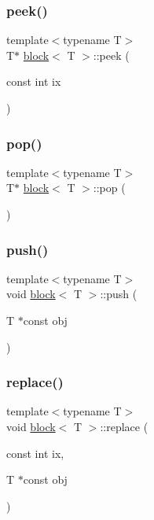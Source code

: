 \subsubsection{\texorpdfstring{peek()}{peek()}}
{\footnotesize\ttfamily template$<$typename T$>$ \\
T$\ast$ \hyperlink{classblock}{block}$<$ T $>$\+::peek (\begin{DoxyParamCaption}\item[{const int}]{ix }\end{DoxyParamCaption})\hspace{0.3cm}{\ttfamily [inline]}}

\mbox{\label{classblock_aa247fbd643eede27ec2ca95882d72301}} 
\subsubsection{\texorpdfstring{pop()}{pop()}}
{\footnotesize\ttfamily template$<$typename T$>$ \\
T$\ast$ \hyperlink{classblock}{block}$<$ T $>$\+::pop (\begin{DoxyParamCaption}{ }\end{DoxyParamCaption})\hspace{0.3cm}{\ttfamily [inline]}}

\mbox{\label{classblock_ab91760496bae106253e3ddd42757287a}} 
\subsubsection{\texorpdfstring{push()}{push()}}
{\footnotesize\ttfamily template$<$typename T$>$ \\
void \hyperlink{classblock}{block}$<$ T $>$\+::push (\begin{DoxyParamCaption}\item[{T $\ast$const}]{obj }\end{DoxyParamCaption})\hspace{0.3cm}{\ttfamily [inline]}}

\mbox{\label{classblock_a2d3ae9852d97ae2debf1bf9b74a5f991}} 
\subsubsection{\texorpdfstring{replace()}{replace()}}
{\footnotesize\ttfamily template$<$typename T$>$ \\
void \hyperlink{classblock}{block}$<$ T $>$\+::replace (\begin{DoxyParamCaption}\item[{const int}]{ix,  }\item[{T $\ast$const}]{obj }\end{DoxyParamCaption})\hspace{0.3cm}{\ttfamily [inline]}}




